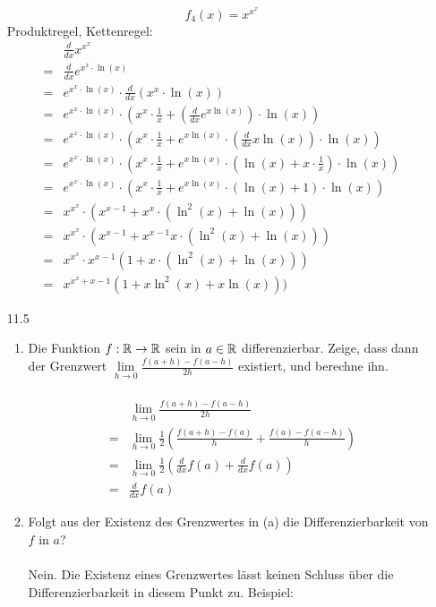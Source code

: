 \documentclass{HM}
\begin{document}
\begin{enumerate}
$$f_4(x)=x^{x^x}$$
Produktregel, Kettenregel:
\begin{align*}
	&\frac{d}{dx}x^{x^x}\\
	=&\frac{d}{dx}e^{x^x\cdot\ln(x)}\\
	=&e^{x^x\cdot\ln(x)}\cdot\frac{d}{dx}\left(x^x\cdot\ln(x)\right)\\
	=&e^{x^x\cdot\ln(x)}\cdot\left(x^x\cdot\frac{1}{x}+\left(\frac{d}{dx}e^{x\ln(x)}\right)\cdot\ln(x)\right)\\
	=&e^{x^x\cdot\ln(x)}\cdot\left(x^x\cdot\frac{1}{x}+e^{x\ln(x)}\cdot\left(\frac{d}{dx}x\ln(x)\right)\cdot\ln(x)\right)\\
	=&e^{x^x\cdot\ln(x)}\cdot\left(x^x\cdot\frac{1}{x}+e^{x\ln(x)}\cdot\left(\ln(x)+x\cdot\frac{1}{x}\right)\cdot\ln(x)\right)\\
	=&e^{x^x\cdot\ln(x)}\cdot\left(x^x\cdot\frac{1}{x}+e^{x\ln(x)}\cdot(\ln(x)+1)\cdot\ln(x)\right)\\
	=&x^{x^x}\cdot(x^{x-1}+ x^x\cdot(\ln^2(x)+\ln(x)))\\
	=&x^{x^x}\cdot(x^{x-1}+ x^{x-1}x\cdot(\ln^2(x)+\ln(x)))\\
	=&x^{x^x}\cdot x^{x-1}(1+x\cdot(\ln^2(x)+\ln(x)))\\
	=&x^{x^x+x-1}(1+x\ln^2(x)+x\ln(x)))
\end{align*}
\newpage
\item [11.5]
\begin{enumerate}
	\item Die Funktion $f:\mathbb{R}\to\mathbb{R}$ sein in $a\in\mathbb{R}$ differenzierbar. Zeige, dass dann der Grenzwert $\lim\limits_{h\to 0}\frac{f(a+h)-f(a-h)}{2h}$ existiert, und berechne ihn.\\\\
	\begin{align*}
	&\lim\limits_{h\to 0}\frac{f(a+h)-f(a-h)}{2h}\\
	=&\lim\limits_{h\to 0}\frac{1}{2}\left(\frac{f(a+h)-f(a)}{h}+\frac{f(a)-f(a-h)}{h}\right)\\
	=&\lim\limits_{h\to 0}\frac{1}{2}\left(\frac{d}{dx}f(a)+\frac{d}{dx}f(a)\right)\\
	=&\frac{d}{dx}f(a)
	\end{align*}
	\item Folgt aus der Existenz des Grenzwertes in (a) die Differenzierbarkeit von $f$ in $a$?\\\\
	Nein. Die Existenz eines Grenzwertes lässt keinen Schluss über die Differenzierbarkeit in diesem Punkt zu. Beispiel:\\

\end{enumerate}
\end{enumerate}
\end{document}
